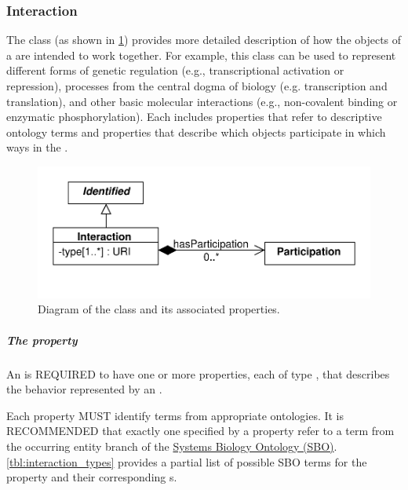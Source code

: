 
\subsubsection{Interaction}
\label{sec:Interaction}

The  class (as shown in \ref{uml:interaction}) provides more detailed description of how the  objects of a  are intended to work together.  
For example, this class can be used to represent different forms of genetic regulation (e.g., transcriptional activation or repression), processes from the central dogma of biology (e.g. transcription and translation), and other basic molecular interactions (e.g., non-covalent binding or enzymatic phosphorylation).
Each  includes  properties that refer to descriptive ontology terms and  properties that describe which  objects participate in which ways in the .

\begin{figure}[ht]
\begin{center}
\includegraphics[scale=0.6]{uml/interaction}
\caption[]{Diagram of the  class and its associated properties.}
\label{uml:interaction}
\end{center}
\end{figure}

\subparagraph{The  property}\label{sec:type:I}

An  is REQUIRED to have one or more  properties, each of type , that describes the behavior represented by an .

Each  property MUST identify terms from appropriate ontologies. 
It is RECOMMENDED that exactly one  specified by a  property refer to a term from the occurring entity branch of the \href{http://www.ebi.ac.uk/sbo/main/}{Systems Biology Ontology (SBO)}.
\ref{tbl:interaction_types} provides a partial list of possible SBO terms for the  property and their corresponding s.

